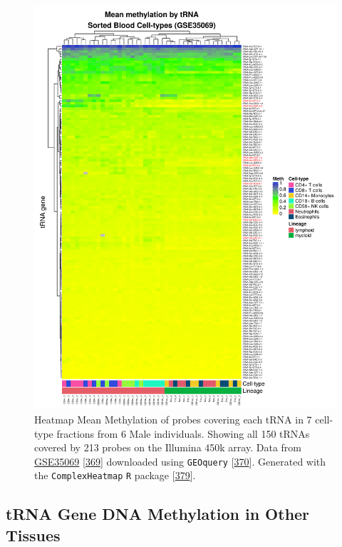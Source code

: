 \documentclass[
]{book}
\begin{document}
\begin{figure}

{\centering \includegraphics[width=0.9\linewidth]{./figs/meanMethbytRNAMatHeatmapLow_bl} 

}

\caption{Heatmap Mean Methylation of probes covering each tRNA in 7 cell-type fractions from 6 Male individuals. Showing all 150 tRNAs covered by 213 probes on the Illumina 450k array. Data from \href{https://www.ncbi.nlm.nih.gov/geo/query/acc.cgi?acc=GSE35069}{GSE35069} {[}\protect\hyperlink{ref-Reinius2012}{369}{]} downloaded using \texttt{GEOquery} {[}\protect\hyperlink{ref-Davis2007p}{370}{]}. Generated with the \texttt{ComplexHeatmap} \texttt{R} package {[}\protect\hyperlink{ref-Gu2016}{379}{]}.}\label{fig:meanMethbytRNAMatHeatmapLow}
\end{figure}



\hypertarget{trna-gene-dna-methylation-in-other-tissues}{%
\subsection{tRNA Gene DNA Methylation in Other Tissues}\label{trna-gene-dna-methylation-in-other-tissues}}
\end{document}
